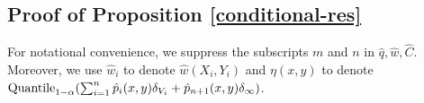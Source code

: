 \subsection{Proof of Proposition \ref{conditional-res}}
For notational convenience, we suppress the subscripts $m$ and $n$ in $\hat{q}, \hat{w}, \hat{C}$. Moreover, we use $\hat{w}_i$ to denote $\hat{w}(X_i, Y_i)$ and $\eta(x, y)$ to denote $\textup{Quantile}_{1-\alpha}(\sum_{i=1}^n \hat{p}_i(x, y)\delta_{V_i} + \hat{p}_{n+1}(x, y) \delta_{\infty})$.

